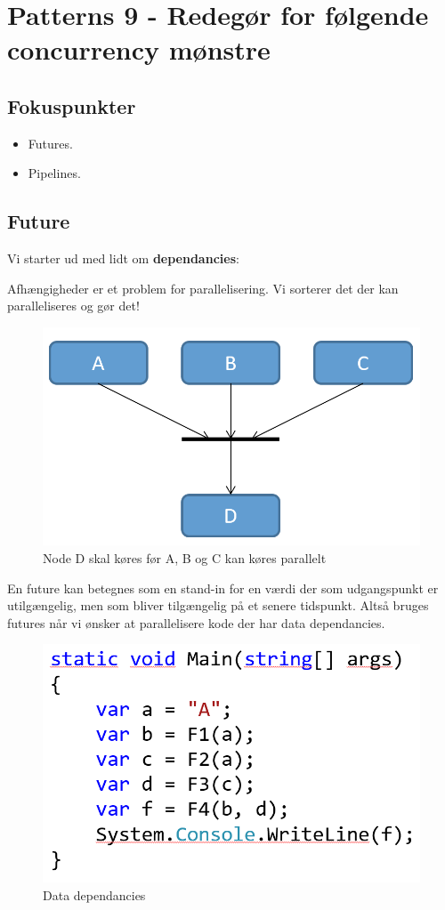 \section{Patterns 9 - Redegør for følgende concurrency mønstre}

\subsection{Fokuspunkter}

\begin{itemize}
	\item Futures.
	\item Pipelines.
\end{itemize}

\subsection{Future}
Vi starter ud med lidt om \textbf{dependancies}:

Afhængigheder er et problem for parallelisering.
Vi sorterer det der kan paralleliseres og gør det!

\begin{figure}[h]
\centering
\includegraphics[width=0.5\linewidth]{figs/pipeFut/dependancies.PNG}
\caption{Node D skal køres før A, B og C kan køres parallelt}
\label{fig:dependancies}
\end{figure}

En future kan betegnes som en stand-in for en værdi der som udgangspunkt er utilgængelig, men som bliver tilgængelig på et senere tidspunkt.
Altså bruges futures når vi ønsker at parallelisere kode der har data dependancies.

\begin{figure}[h]
	\centering
	\includegraphics[width=0.5\linewidth]{figs/pipeFut/parallelThis.PNG}
	\caption{Data dependancies}
	\label{fig:Datadependancies}
\end{figure}

